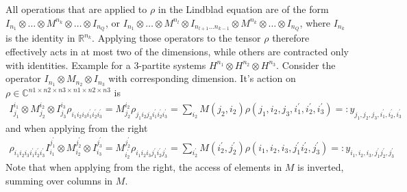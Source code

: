 \documentclass[letterpaper]{article}
\newcommand{\R}{\mathds{R}}
\newcommand{\C}{\mathds{C}}
\begin{document}
All operations that are applied to $\rho$ in the Lindblad equation are of the form $I_{n_1}\otimes \dots \otimes M^{n_k} \otimes \dots \otimes I_{n_Q}$, or $I_{n_1}\otimes \dots \otimes M^{n_l} \otimes I_{n_{l+1}\dots n_{k-1}} \otimes M^{n_k} \otimes \dots \otimes I_{n_Q}$, where $I_{n_k}$ is the identity in $\R^{n_k}$. Applying those operators to the tensor $\rho$ therefore effectively acts in at most two of the dimensions, while others are contracted only with identities. Example for a 3-partite systems $H^{n_1} \otimes H^{n_2} \otimes H^{n_3}$. Consider the operator $I_{n_1} \otimes M_{n_2} \otimes I_{n_3}$ with corresponding dimension. It's action on $\rho \in \C^{n1\times n2\times n3 \times n1\times n2 \times n3}$ is
\begin{align}
    I^{i_1}_{j_1}\otimes M^{i_2}_{j_2} \otimes I^{i_3}_{j_3} \rho_{i_1i_2i_3i_1^{\prime}i_2^\prime i_3^\prime} = M^{i_2}_{j_2} \rho_{j_1i_2j_3i_1^{\prime}i_2^\prime i_3^\prime} = \sum_{i_2} M(j_2, i_2) \rho(j_1,i_2,j_3,i_1^{\prime},i_2^\prime, i_3^\prime)  =: y_{j_1,j_2,j_3,i_1^{\prime},i_2^\prime,i_3^\prime}
\end{align}
and when applying from the right
\begin{align}
    \rho_{i_1i_2i_3i_1^{\prime}i_2^\prime i_3^\prime}I^{j_1^{\prime}}_{i_1}\otimes M^{j_2^\prime}_{i_2} \otimes I^{j_3^\prime}_{i_3}  = M^{j_2^\prime}_{i_2^\prime} \rho_{i_1i_2i_3j_1^{\prime}i_2^\prime j_3^\prime} = \sum_{i_2^\prime} M(i_2^{\prime}, j_2^\prime) \rho(i_1,i_2,i_3,j_1^{\prime}i_2^\prime, j_3^\prime)  =: y_{i_1,i_2,i_3,j_1^{\prime}j_2^\prime, j_3^\prime}
\end{align}
Note that when applying from the right, the access of elements in $M$ is inverted, summing over columns in $M$.
\end{document}
